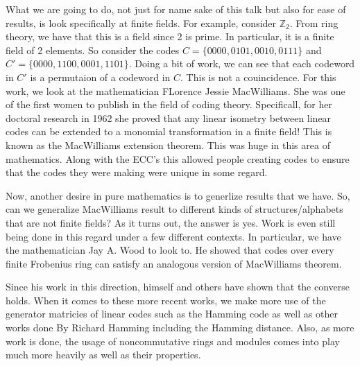 What we are going to do, not just for name sake of this talk but also for ease of results, is look
specifically at finite fields. For example, consider $\mathbb{Z}_2$. From ring theory, we
have that this is a field since 2 is prime. In particular, it is a finite field of 2 elements. So
consider the codes $C=\{0000,0101,0010,0111\}$ and $C'=\{0000,1100,0001,1101\}$. Doing a bit of work, we
can see that each codeword in $C'$ is a permutaion of a codeword in $C$. This is not a couincidence.
For this work, we look at the mathematician FLorence Jessie MacWilliams. She was one of the first women
to publish in the field of coding theory. Specificall, for her doctoral research in 1962 she proved that any
linear isometry between linear codes can be extended to a monomial transformation in a finite field!
This is known as the MacWilliams extension theorem. This was huge in this area of mathematics. Along
with the ECC's this allowed people creating codes to ensure that the codes they were making were unique
in some regard.

Now, another desire in pure mathematics is to generlize results that we have. So, can we generalize
MacWilliams result to different kinds of structures/alphabets that are not finite fields? As it turns
out, the answer is yes. Work is even still being done in this regard under a few different contexts.
In particular, we have the mathematician Jay A. Wood to look to. He showed that codes over every finite
Frobenius ring can satisfy an analogous version of MacWilliams theorem.

Since his work in this direction, himself and others have shown that the converse holds. When it comes
to these more recent works, we make more use of the generator matricies of linear codes such as the
Hamming code as well as other works done By Richard Hamming including the Hamming distance. Also, as
more work is done, the usage of noncommutative rings and modules comes into play much more heavily
as well as their properties.

